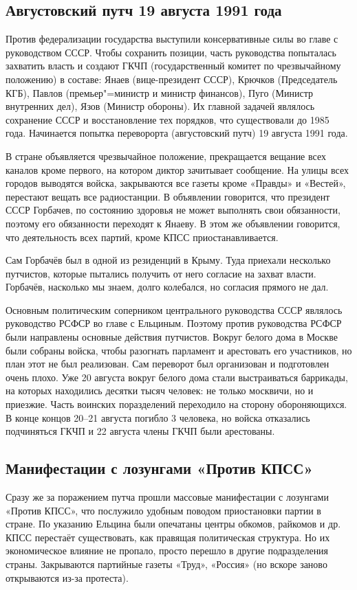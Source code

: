 \subsection{Августовский путч 19 августа 1991 года}

Против федерализации государства выступили консервативные силы во главе с руководством СССР. Чтобы сохранить позиции, часть руководства попыталась захватить власть и создают ГКЧП (государственный комитет по чрезвычайному положению) в составе: Янаев (вице-президент СССР), Крючков (Председатель КГБ), Павлов (премьер"=министр и министр финансов), Пуго (Министр внутренних дел), Язов (Министр обороны). Их главной задачей являлось сохранение СССР и восстановление тех порядков, что существовали до 1985 года. 
Начинается попытка переворорта (августовский путч) 19 августа 1991 года. 

В стране объявляется чрезвычайное положение, прекращается вещание всех каналов кроме первого, на котором диктор зачитывает сообщение. На улицы всех городов выводятся войска, закрываются все газеты кроме «Правды» и «Вестей», перестают вещать все радиостанции. В объявлении говорится, что президент СССР Горбачев, по состоянию здоровья не может выполнять свои обязанности, поэтому его обязанности переходят к Янаеву. В этом же объявлении говорится, что деятельность всех партий, кроме КПСС приостанавливается.

Сам Горбачёв был в одной из резиденций в Крыму. Туда приехали несколько путчистов, которые пытались получить от него согласие на захват власти. Горбачёв, насколько мы знаем, долго колебался, но согласия прямого не дал.

Основным политическим соперником центрального руководства СССР являлось руководство РСФСР во главе с Ельциным. Поэтому против руководства РСФСР были направлены основные действия путчистов. Вокруг белого дома в Москве были собраны войска, чтобы разогнать парламент и арестовать его участников, но план этот не был реализован. Сам переворот был организован и подготовлен очень плохо. Уже 20 августа вокруг белого дома стали выстраиваться баррикады, на которых находились десятки тысяч человек: не только москвичи, но и приезжие. Часть воинских поразделений переходило на сторону обороняющихся. В конце концов 20--21 августа погибло 3 человека, но войска отказались подчиняться ГКЧП и 22 августа члены ГКЧП были арестованы. 

\subsection{Манифестации с лозунгами «Против КПСС»}
Сразу же за поражением путча прошли массовые манифестации с лозунгами «Против КПСС», что послужило удобным поводом приостановки партии в стране. По указанию Ельцина были опечатаны центры обкомов, райкомов и др. КПСС перестаёт существовать, как правящая политическая структура. Но их экономическое влияние не пропало, просто перешло в другие подразделения страны. Закрываются партийные газеты «Труд», «Россия» (но вскоре заново открываются из-за протеста).

